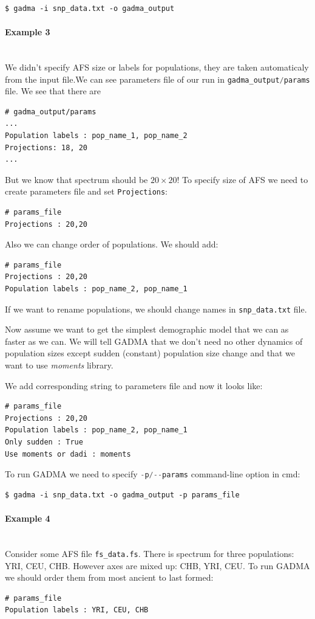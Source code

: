 \documentclass[12pt]{article}
\makeatletter
\newcommand{\moments}{\textit{moments}\xspace}
\newcommand{\py}[1]{\lstinline[language=Python, showstringspaces=False]@#1@}
\makeatother
\begin{document}
\begin{lstlisting}
$ gadma -i snp_data.txt -o gadma_output
\end{lstlisting}


\paragraph{Example 3}\mbox{}\\
We didn't specify AFS size or labels for populations, they are taken automaticaly from the input file.We can see parameters file of our run in \py{gadma_output/params} file. We see that there are 
\begin{lstlisting}
# gadma_output/params
...
Population labels : pop_name_1, pop_name_2
Projections: 18, 20
...
\end{lstlisting}
But we know that spectrum should be $20 \times 20$! To specify size of AFS we need to create parameters file and set \py{Projections}:

\begin{lstlisting}
# params_file
Projections : 20,20
\end{lstlisting}

Also we can change order of populations. We should add:
\begin{lstlisting}
# params_file
Projections : 20,20
Population labels : pop_name_2, pop_name_1
\end{lstlisting}

If we want to rename populations, we should change names in \py{snp_data.txt} file.

Now assume we want to get the simplest demographic model that we can as faster as we can. We will tell GADMA that we don't need no other dynamics of population sizes except sudden (constant) population size change and that we want to use \moments library.

We add corresponding string to parameters file and now it looks like:
\begin{lstlisting}
# params_file
Projections : 20,20
Population labels : pop_name_2, pop_name_1
Only sudden : True
Use moments or dadi : moments
\end{lstlisting}

To run GADMA we need to specify \py{-p/--params} command-line option in cmd:
\begin{lstlisting}
$ gadma -i snp_data.txt -o gadma_output -p params_file
\end{lstlisting}

\paragraph{Example 4}\mbox{}\\
Consider some AFS file \py{fs_data.fs}. There is spectrum for three populations: YRI, CEU, CHB. However axes are mixed up: CHB, YRI, CEU. To run GADMA we should order them from most ancient to last formed:
\begin{lstlisting}
# params_file
Population labels : YRI, CEU, CHB
\end{lstlisting}
\end{document}
